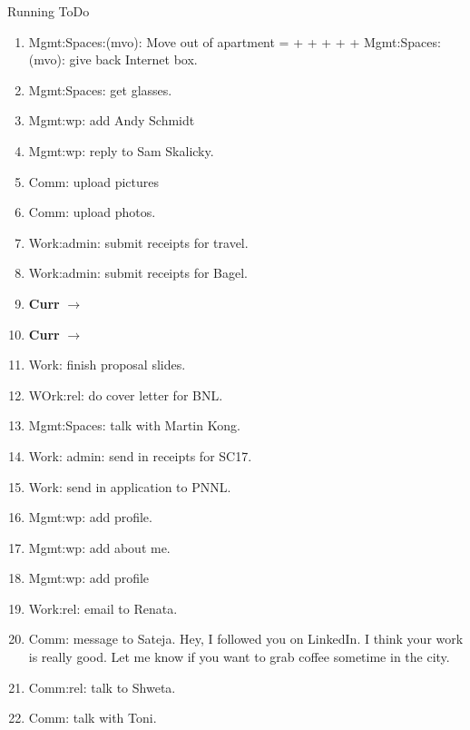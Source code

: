\begin{columns}
\begin{column}{0.6\linewidth}
\begin{block}{Running ToDo}
\begin{enumerate}
      \item \tiny Mgmt:Spaces:(mvo): Move out of apartment  =
         +  +  +  +  + Mgmt:Spaces:(mvo): give back Internet box.  

      \item \tiny Mgmt:Spaces: get glasses. 

      \item \tiny Mgmt:wp: add Andy Schmidt
      \item \tiny Mgmt:wp: reply to Sam Skalicky. 

      \item \tiny Comm: upload pictures
      \item \tiny Comm: upload photos. 
  
      \item \tiny Work:admin: submit receipts for travel. 
      \item \tiny Work:admin: submit receipts for Bagel. 
        \tiny \item[] \tiny \textbf{Curr} $\rightarrow$

      \item \tiny {\bf Curr} $\rightarrow$
      \item \tiny Work: finish proposal slides. 
      \item \tiny WOrk:rel: do cover letter for BNL.
      \item \tiny Mgmt:Spaces: talk with Martin Kong.
        
      \item \tiny Work: admin: send in receipts for SC17.
  
      \item \tiny Work: send in application to PNNL. 
        
      \item \tiny Mgmt:wp: add profile.
      \item \tiny Mgmt:wp: add about me. 
        
      \item \tiny Mgmt:wp: add profile 
      \item \tiny Work:rel: email to Renata.  
      \item \tiny Comm: message to Sateja. 
        Hey, I followed you on LinkedIn. I think your work is really good. 
        Let me know if you want to grab coffee sometime in the city. 
      \item \tiny Comm:rel: talk to Shweta.
      \item \tiny Comm: talk with Toni. 


\end{enumerate}
\end{block}
\end{column}
\end{columns}
